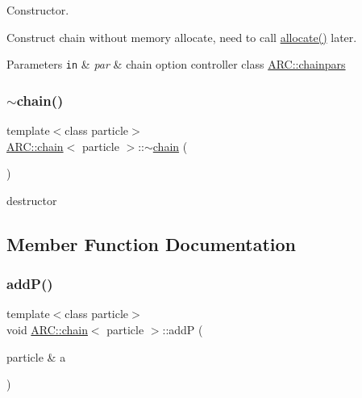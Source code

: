 Constructor. 

Construct chain without memory allocate, need to call \hyperlink{classARC_1_1chain_ac0bbd32e714913e1e8eb36eb2e8c3fd4}{allocate()} later. 
\begin{DoxyParams}[1]{Parameters}
\mbox{\tt in}  & {\em par} & chain option controller class \hyperlink{classARC_1_1chainpars}{A\+R\+C\+::chainpars} \\
\hline
\end{DoxyParams}
\hypertarget{classARC_1_1chain_a3467a68afb2daebec6c57899897a461c}{}\label{classARC_1_1chain_a3467a68afb2daebec6c57899897a461c} 
\subsubsection{\texorpdfstring{$\sim$chain()}{~chain()}}
{\footnotesize\ttfamily template$<$class particle$>$ \\
\hyperlink{classARC_1_1chain}{A\+R\+C\+::chain}$<$ particle $>$\+::$\sim$\hyperlink{classARC_1_1chain}{chain} (\begin{DoxyParamCaption}{ }\end{DoxyParamCaption})\hspace{0.3cm}{\ttfamily [inline]}}



destructor 



\subsection{Member Function Documentation}
\hypertarget{classARC_1_1chain_a0f91c399beb1e5c0db6ed7e2b4d00477}{}\label{classARC_1_1chain_a0f91c399beb1e5c0db6ed7e2b4d00477} 
\subsubsection{\texorpdfstring{add\+P()}{addP()}\hspace{0.1cm}{\footnotesize\ttfamily [1/3]}}
{\footnotesize\ttfamily template$<$class particle$>$ \\
void \hyperlink{classARC_1_1chain}{A\+R\+C\+::chain}$<$ particle $>$\+::addP (\begin{DoxyParamCaption}\item[{particle \&}]{a }\end{DoxyParamCaption})\hspace{0.3cm}{\ttfamily [inline]}}



